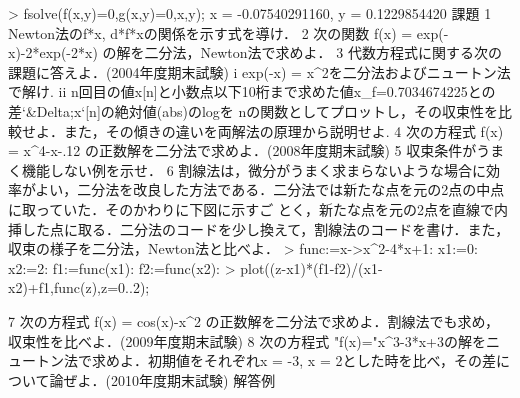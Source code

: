 > fsolve({f(x,y)=0,g(x,y)=0},{x,y});
                    {x = -0.07540291160, y = 0.1229854420}
課題
1 Newton法のf*x, d*f*xの関係を示す式を導け．
2 次の関数 f(x) = exp(-x)-2*exp(-2*x) の解を二分法，Newton法で求めよ．
3 代数方程式に関する次の課題に答えよ．(2004年度期末試験)
       i exp(-x) = x^2を二分法およびニュートン法で解け.
       ii 
          n回目の値x[n]と小数点以下10桁まで求めた値x_f=0.7034674225との差`&Delta;x`[n]の絶対値(abs)のlogを
          nの関数としてプロットし，その収束性を比較せよ．また，その傾きの違いを両解法の原理から説明せよ.
4 次の方程式 f(x) = x^4-x-.12 の正数解を二分法で求めよ．(2008年度期末試験)
5 収束条件がうまく機能しない例を示せ．
6 
  割線法は，微分がうまく求まらないような場合に効率がよい，二分法を改良した方法である．二分法では新たな点を元の2点の中点に取っていた．そのかわりに下図に示すご
  とく，新たな点を元の2点を直線で内挿した点に取る．二分法のコードを少し換えて，割線法のコードを書け．また，収束の様子を二分法，Newton法と比べよ．
> func:=x->x^2-4*x+1: x1:=0: x2:=2: f1:=func(x1): f2:=func(x2):
> plot({(z-x1)*(f1-f2)/(x1-x2)+f1,func(z)},z=0..2);

7 次の方程式 f(x) = cos(x)-x^2 の正数解を二分法で求めよ．割線法でも求め，収束性を比べよ．(2009年度期末試験)
8 次の方程式 "f(x)="x^3-3*x+3の解をニュートン法で求めよ．初期値をそれぞれx = -3, x =
  2とした時を比べ，その差について論ぜよ．(2010年度期末試験)
解答例
